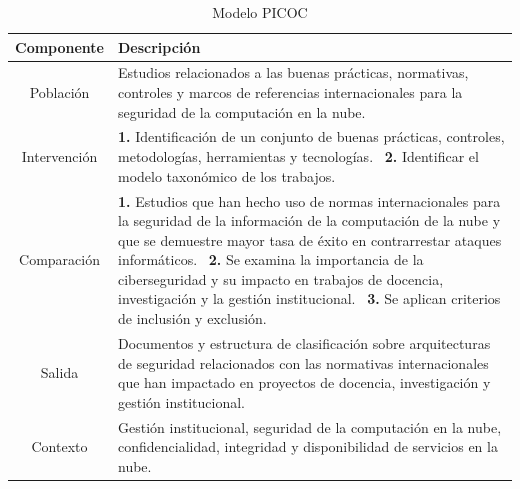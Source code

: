 \begin{table}[H]
	\centering
	\renewcommand{\arraystretch}{1.5} %
	\fontsize{9pt}{10pt}\selectfont %
	\begin{tabular}{|c|p{12cm}|} %
		\hline
		\textbf{Componente} & \textbf{Descripción}  \\ 
		\hline
		Población & Estudios relacionados a las buenas prácticas, normativas, controles y marcos de referencias internacionales para la seguridad de la computación en la nube. \\
        Intervención &
        \textbf{1.} Identificación de un conjunto de buenas prácticas, controles, metodologías, herramientas y tecnologías.~\newline
        \textbf{2.} Identificar el modelo taxonómico de los trabajos. \\
        Comparación &
        \textbf{1.} Estudios que han hecho uso de normas internacionales para la seguridad de la información de la computación de la nube y que se demuestre mayor tasa de éxito en contrarrestar ataques informáticos.~\newline
        \textbf{2.} Se examina la importancia de la ciberseguridad y su impacto en trabajos de docencia, investigación y la gestión institucional.~\newline
        \textbf{3.} Se aplican criterios de inclusión y exclusión. \\
        Salida & Documentos y estructura de clasificación sobre arquitecturas de seguridad relacionados con las normativas internacionales que han impactado en proyectos de docencia, investigación y gestión institucional. \\
        Contexto & Gestión institucional, seguridad de la computación en la nube, confidencialidad, integridad y disponibilidad de servicios en la nube. \\    
		\hline
	\end{tabular}
	\caption{Modelo PICOC}\label{table:modelo-picoc}
\end{table}



